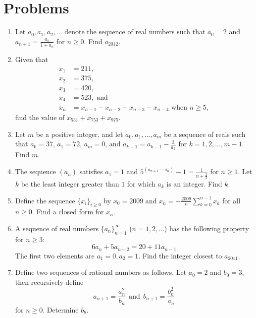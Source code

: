 \documentclass[11pt]{article}
\theoremstyle{theorem}
\theoremstyle{definition}
\theoremstyle{remark}
\theoremstyle{definition}
\theoremstyle{remark}
\begin{document}
\section{Problems}
\begin{enumerate}

\item Let $a_0, a_1, a_2, \ldots$ denote the sequence of real numbers such that $a_0 = 2$ and $a_{n+1}=\frac{a_n}{1+a_n}$ for $n \ge 0$. Find $a_{2012}$. %

\item Given that
\begin{align*}
x_{1}&=211,\\ 
x_{2}&=375,\\ 
x_{3}&=420,\\ 
x_{4}&=523, \text{ and}\\ 
x_{n}&=x_{n-1}-x_{n-2}+x_{n-3}-x_{n-4} \text{ when } n \geq 5, 
\end{align*}
find the value of $x_{531}+x_{753}+x_{975}$. %

\item Let $m$ be a positive integer, and let $a_0, a_1,\ldots,a_m$ be a sequence of reals such that $a_0=37$, $a_1=72$, $a_m=0$, and $a_{k+1}=a_{k-1}-\frac{3}{a_k}$ for $k=1,2, \dots, m-1$. Find $m$. %

\item The sequence $ (a_n)$ satisfies $ a_1 = 1$ and $ \displaystyle 5^{(a_{n+1}-a_n)} - 1 = \frac{1}{n+\frac{2}{3}}$ for $ n \geq 1$. Let $ k$ be the least integer greater than $ 1$ for which $ a_k$ is an integer. Find $k$. %

\item Define the sequence $\{x_i\}_{i \ge 0}$ by $x_{0}=2009$ and $x_n = -\frac{2009}{n}\sum_{k = 0}^{n-1} x_{k}$ for all $n \ge 0$. Find a closed form for $x_n$. %

\item A sequence of real numbers $\{a_n\}_{n=1}^{\infty}$ ($n = 1,2,\ldots$) has the following property for $n \ge 3$:
\[6a_n + 5a_{n-2} = 20 + 11a_{n-1}\] 
The first two elements are $a_1=0, a_2 = 1$. Find the integer closest to $a_{2011}$.%

\item Define two sequences of rational numbers as follows. Let $a_0=2$ and $b_0=3$, then recursively define
\[a_{n+1} = \frac{a_n^2}{b_n} \ \  \text{and} \ \ b_{n+1} = \frac{b_n^2}{a_n} \] for $n \ge 0$. Determine $b_8$. %


\end{enumerate}
\end{document}
